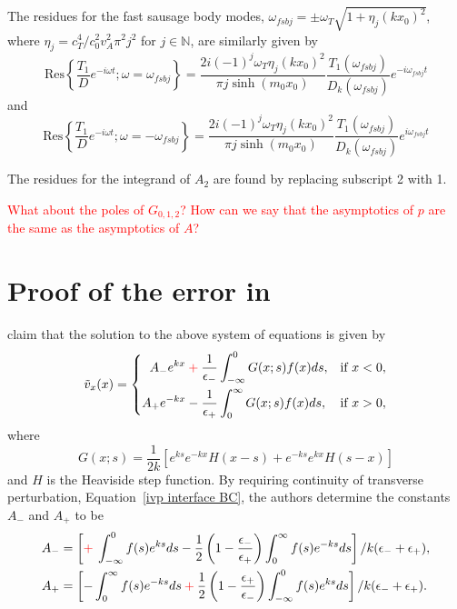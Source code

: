 \documentclass[12pt, draft]{../style-files/ociamthesis}
\begin{document}
The residues for the fast sausage body modes, $\omega_{fsbj} = \pm \omega_T\sqrt{1 + \eta_j(kx_0)^2}$, where $\eta_j = c_T^4 / c_0^2v_A^2\pi^2j^2$ for $j \in \mathbb{N}$, are similarly given by
\begin{equation}
\mathrm{Res}\left\{ \frac{T_1}{D}e^{-i\omega t}; \omega = \omega_{fsbj} \right\} = \frac{2i(-1)^{j}\omega_T\eta_j(kx_0)^2}{\pi j\sinh(m_0x_0)} \frac{T_1(\omega_{fsbj})}{D_k(\omega_{fsbj})}e^{-i\omega_{fsbj}t}
\end{equation}
and
\begin{equation}
\mathrm{Res}\left\{ \frac{T_1}{D}e^{-i\omega t}; \omega = -\omega_{fsbj} \right\} = \frac{2i(-1)^{j}\omega_T\eta_j(kx_0)^2}{\pi j\sinh(m_0x_0)} \frac{T_1(\omega_{fsbj})}{D_k(\omega_{fsbj})}e^{i\omega_{fsbj}t}
\end{equation}

The residues for the integrand of $A_2$ are found by replacing subscript 2 with 1.


\textcolor{red}{What about the poles of $G_{0,1,2}$? How can we say that the asymptotics of $p$ are the same as the asymptotics of $A$?}


\appendix

\section{Proof of the error in \cite{rae_etal81}}

\cite{rae_etal81} claim that the solution to the above system of equations is given by 
\begin{equation}
\tilde{v}_x(x) = \left\{
\begin{aligned}
A_-e^{kx}  \: \textcolor{red}{+} \: \frac{1}{\epsilon_-} & \int_{-\infty}^{0} G(x;s)f(x)ds, & \text{if  } x<0,\\
A_+e^{-kx} - \frac{1}{\epsilon_+} & \int_{0}^{\infty} G(x;s)f(x)ds, & \text{if  } x>0,
\end{aligned}
\right.
\label{ivp interface sol}
\end{equation}
where
\begin{equation}
G(x;s) = \frac{1}{2k}[e^{ks}e^{-kx}H(x-s) + e^{-ks}e^{kx}H(s-x)]
\end{equation}
and $H$ is the Heaviside step function. By requiring continuity of transverse perturbation, Equation~\eqref{ivp interface BC}, the authors determine the constants $A_-$ and $A_+$ to be
\begin{align}
A_- & = \left[\textcolor{red}{+} \: \int_{-\infty}^0 f(s)e^{ks} ds - \frac{1}{2}\left(1 - \frac{\epsilon_-}{\epsilon_+}\right)\int_0^\infty f(s)e^{-ks} ds\right] / k(\epsilon_- + \epsilon_+), \\
A_+ & = \left[-\int_0^\infty f(s)e^{-ks} ds \: \textcolor{red}{+} \: \frac{1}{2}\left(1 - \frac{\epsilon_+}{\epsilon_-}\right)\int_{-\infty}^0 f(s)e^{ks} ds\right] / k(\epsilon_- + \epsilon_+).
\label{ivp interface constants}
\end{align}
\end{document}
